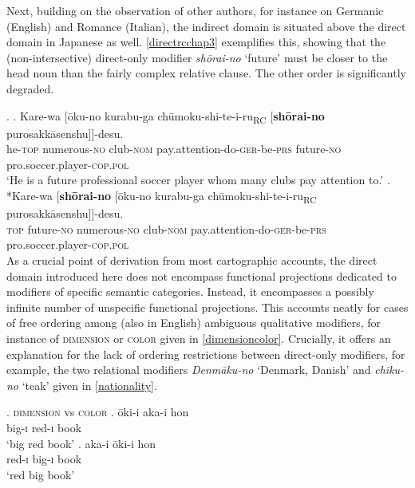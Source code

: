 Next, building on the observation of other authors, for instance \citet{cinque:2010:adj} on Germanic (English) and Romance (Italian), the indirect domain is situated above the direct domain in Japanese as well. \ref{directrcchap3} exemplifies this, showing that the (non-intersective) direct-only modifier \textit{shōrai-no} `future’ must be closer to the head noun than the fairly complex relative clause. The other order is significantly degraded. 

\ex. \label{directrcchap3} \ag. Kare-wa [ōku-no kurabu-ga chūmoku-shi-te-i-ru\textsubscript{RC} [\textbf{shōrai-no} purosakkāsenshu]]-desu.\\
he-\textsc{top} numerous-\textsc{no} club-\textsc{nom} pay.attention-do-\textsc{ger}-be-\textsc{prs} future-\textsc{no} pro.soccer.player-\textsc{cop.pol}\\
`He is a future professional soccer player whom many clubs pay attention to.’
\bg. *Kare-wa [\textbf{shōrai-no} [ōku-no kurabu-ga chūmoku-shi-te-i-ru\textsubscript{RC} purosakkāsenshu]]-desu.\\
\textsc{top} future-\textsc{no} numerous-\textsc{no} club-\textsc{nom} pay.attention-do-\textsc{ger}-be-\textsc{prs} pro.soccer.player-\textsc{cop.pol}\\

As a crucial point of derivation from most cartographic accounts, the direct domain introduced here does not encompass functional projections dedicated to modifiers of specific semantic categories. Instead, it encompasses a possibly infinite number of unspecific functional projections. This accounts neatly for cases of free ordering among (also in English) ambiguous qualitative modifiers, for instance of \textsc{dimension} or \textsc{color} given in \ref{dimensioncolor}. Crucially, it offers an explanation for the lack of ordering restrictions between direct-only modifiers, for example, the two relational modifiers \textit{Denmāku-no} `Denmark, Danish’ and \textit{chīku-no} `teak’ given in \ref{nationality}.

\ex. \textsc{dimension} vs \textsc{color} \label{dimensioncolor}
\ag. ōki-i aka-i hon\\
big-\textsc{i} red-\textsc{i} book\\
`big red book’
\bg. aka-i ōki-i hon\\
red-\textsc{i} big-\textsc{i} book\\
`red big book’

